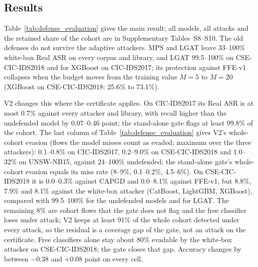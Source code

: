 \subsection{Results}
\label{sec:defense_results}

\begin{table}[!htbp]
\caption{Defenses (Real ASR, \%, on flows still detected). U: undefended; V2 (bold): gate fused with a free classifier; FFE: FFE-v1, $M=20$; WB: white-box attacker. Acc.\ and Rec.\: clean accuracy and attack recall of U and V2. Real ASR is computed on the flows the model still detects; V2 whole cohort is the maximum whole-cohort evasion over the three attackers (Supplementary Tables~S8--S10, S13). Cohort of 1,000 detected flows per cell; one seed.}\label{tab:defense_evaluation}
\centering
\linespread{1}\selectfont
\resizebox{\textwidth}{!}{%
%
}
\end{table}

Table~\ref{tab:defense_evaluation} gives the main result; all models, all attacks and the retained share of the cohort are in Supplementary Tables~S8--S10. The old defenses do not survive the adaptive attackers. MPS and LGAT leave 33--100\% white-box Real ASR on every corpus and library, and LGAT 99.5--100\% on CSE-CIC-IDS2018 and for XGBoost on CIC-IDS2017; its protection against FFE-v1 collapses when the budget moves from the training value $M=5$ to $M=20$ (XGBoost on CSE-CIC-IDS2018: 25.6\% to 73.1\%).

V2 changes this where the certificate applies. On CIC-IDS2017 its Real ASR is at most 0.7\% against every attacker and library, with recall higher than the undefended model by 0.07--0.46 point; the stand-alone gate flags at least 99.8\% of the cohort. The last column of Table~\ref{tab:defense_evaluation} gives V2's whole-cohort evasion (flows the model misses count as evaded; maximum over the three attackers): 0.1--0.8\% on CIC-IDS2017, 0.2--9.0\% on CSE-CIC-IDS2018 and 1.0--32\% on UNSW-NB15, against 24--100\% undefended; the stand-alone gate's whole-cohort evasion equals its miss rate (8--9\%, 0.1--0.2\%, 4.5--6\%). On CSE-CIC-IDS2018 it is 0.0--0.3\% against CAPGD and 0.0--8.1\% against FFE-v1, but 8.8\%, 7.9\% and 8.1\% against the white-box attacker (CatBoost, LightGBM, XGBoost), compared with 99.5--100\% for the undefended models and for LGAT. The remaining 8\% are cohort flows that the gate does not flag and the free classifier loses under attack; V2 keeps at least 91\% of the whole cohort detected under every attack, so the residual is a coverage gap of the gate, not an attack on the certificate. Free classifiers alone stay about 80\% evadable by the white-box attacker on CSE-CIC-IDS2018; the gate closes that gap. Accuracy changes by between $-0.38$ and $+0.08$ point on every cell.

